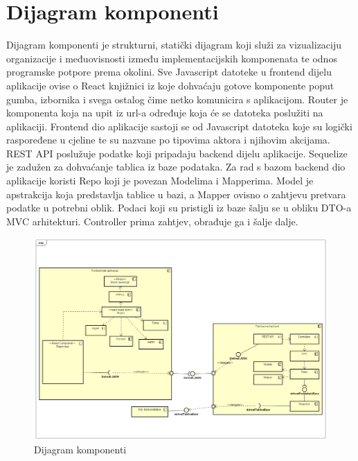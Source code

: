 			\eject
		\section{Dijagram komponenti}
		
			   Dijagram komponenti je strukturni, statički dijagram koji služi za vizualizaciju organizacije i međuovisnosti između implementacijskih komponenata te odnos programske potpore prema okolini. Sve Javascript datoteke u frontend dijelu aplikacije ovise o React knjižnici iz koje dohvaćaju gotove komponente poput gumba, izbornika i svega ostalog čime netko komunicira s aplikacijom. Router je komponenta koja na upit iz url-a određuje koja će se datoteka poslužiti na aplikaciji. Frontend dio aplikacije sastoji se od Javascript datoteka koje su logički raspoređene u cjeline te su nazvane po tipovima aktora i njihovim akcijama. REST API poslužuje podatke koji pripadaju backend dijelu aplikacije. Sequelize je zadužen za dohvaćanje tablica iz baze podataka. Za rad s bazom backend dio aplikacije koristi Repo koji je povezan Modelima i Mapperima. Model je apstrakcija koja predstavlja tablice u bazi, a Mapper ovisno o zahtjevu pretvara podatke u potrebni oblik. Podaci koji su pristigli iz baze šalju se u obliku DTO-a MVC arhitekturi. Controller prima zahtjev, obrađuje ga i šalje dalje.
			   
			   \begin{figure}[H]
    			\includegraphics[width=1\linewidth]{dijagrami/Dijagram komponenti.png}
    			\caption{Dijagram komponenti}
    			\label{fig:Dijagram komponenti} 
    		\end{figure}